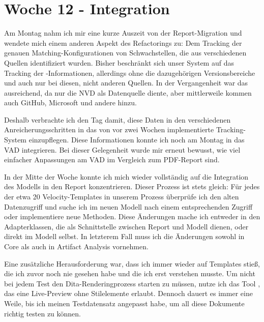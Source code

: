 \section{Woche 12 - Integration} \label{sec:bericht-wo-12}



Am Montag nahm ich mir eine kurze Auszeit von der Report-Migration und wendete mich einem anderen Aspekt des Refactorings zu:
Dem Tracking der genauen Matching-Konfigurationen von Schwachstellen, die aus verschiedenen Quellen identifiziert wurden.
Bisher beschränkt sich unser System auf das Tracking der -Informationen, allerdings ohne die dazugehörigen Versionsbereiche und auch nur bei diesen, nicht anderen Quellen.
In der Vergangenheit war das ausreichend, da nur die NVD als Datenquelle diente, aber mittlerweile kommen auch GitHub, Microsoft und andere hinzu.

Deshalb verbrachte ich den Tag damit, diese Daten in den verschiedenen Anreicherungsschritten in das von vor zwei Wochen implementierte Tracking-System einzupflegen.
Diese Informationen konnte ich noch am Montag in das VAD integrieren.
Bei dieser Gelegenheit wurde mir erneut bewusst, wie viel einfacher Anpassungen am VAD im Vergleich zum PDF-Report sind.


In der Mitte der Woche konnte ich mich wieder vollständig auf die Integration des Modells in den Report konzentrieren.
Dieser Prozess ist stets gleich: Für jedes der etwa 20 Velocity-Templates in unserem Prozess überprüfe ich den alten Datenzugriff und suche ich im neuen Modell nach einem entsprechenden Zugriff oder implementiere neue Methoden.
Diese Änderungen mache ich entweder in den Adapterklassen, die als Schnittstelle zwischen Report und Modell dienen, oder direkt im Modell selbst.
In letzterem Fall muss ich die Änderungen sowohl in Core als auch in Artifact Analysis vornehmen.

Eine zusätzliche Herausforderung war, dass ich immer wieder auf Templates stieß, die ich zuvor noch nie gesehen habe und die ich erst verstehen musste.
Um nicht bei jedem Test den Dita-Renderingprozess starten zu müssen, nutze ich das Tool , das eine Live-Preview ohne Stilelemente erlaubt.
Dennoch dauert es immer eine Weile, bis ich meinen Testdatensatz angepasst habe, um all diese Dokumente richtig testen zu können.


